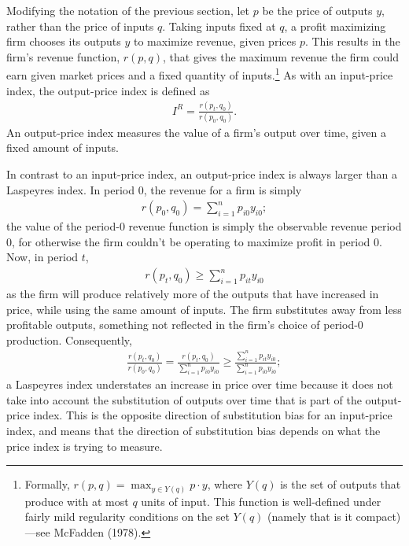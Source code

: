 \documentclass[]{article}
\begin{document}
Modifying the notation of the previous section, let \(p\) be the price of outputs \(y\), rather than the price of inputs \(q\). Taking inputs fixed at \(q\), a profit maximizing firm chooses its outputs \(y\) to maximize revenue, given prices \(p\). This results in the firm's revenue function, \(r(p, q)\), that gives the maximum revenue the firm could earn given market prices and a fixed quantity of inputs.\footnote{Formally, \(r(p, q) = \max_{y \in Y(q)} p \cdot y\), where \(Y(q)\) is the set of outputs that produce with at most \(q\) units of input. This function is well-defined under fairly mild regularity conditions on the set \(Y(q)\) (namely that is it compact)---see McFadden (1978).} As with an input-price index, the output-price index is defined as
\begin{align*}
I^{R} = \frac{r(p_{t}, q_{0})}{r(p_{0}, q_{0})}.
\end{align*}
An output-price index measures the value of a firm's output over time, given a fixed amount of inputs.

In contrast to an input-price index, an output-price index is always larger than a Laspeyres index. In period 0, the revenue for a firm is simply
\begin{align*}
r(p_{0}, q_{0}) = \sum_{i = 1}^{n} p_{i0} y_{i0};
\end{align*}
the value of the period-0 revenue function is simply the observable revenue period 0, for otherwise the firm couldn't be operating to maximize profit in period 0. Now, in period \(t\),
\begin{align*}
r(p_{t}, q_{0}) \geq \sum_{i = 1}^{n} p_{it} y_{i0}
\end{align*}
as the firm will produce relatively more of the outputs that have increased in price, while using the same amount of inputs. The firm substitutes away from less profitable outputs, something not reflected in the firm's choice of period-0 production. Consequently,
\begin{align*}
\frac{r(p_{t}, q_{0})}{r(p_{0}, q_{0})} = \frac{r(p_{t}, q_{0})}{\sum_{i = 1}^{n} p_{i0} y_{i0}} \geq \frac{\sum_{i = 1}^{n} p_{it} y_{i0}}{\sum_{i = 1}^{n} p_{i0} y_{i0}};
\end{align*}
a Laspeyres index understates an increase in price over time because it does not take into account the substitution of outputs over time that is part of the output-price index. This is the opposite direction of substitution bias for an input-price index, and means that the direction of substitution bias depends on what the price index is trying to measure.
\end{document}
